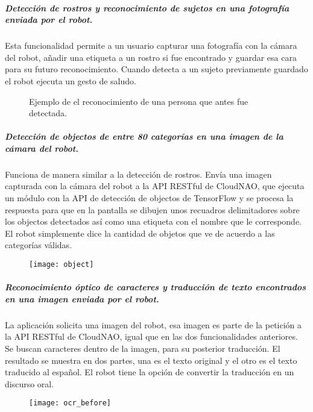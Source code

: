 \subparagraph{Detección de rostros y reconocimiento de sujetos en una fotografía enviada por el robot.}
\label{\detokenize{users_docs:deteccion-de-rostros-en-una-fotografia-enviada-por-el-robot}}
Esta funcionalidad permite a un usuario
capturar una fotografía con la cámara del robot, añadir
una etiqueta a un rostro si fue encontrado y guardar esa cara para su futuro reconocimiento.
Cuando detecta a un sujeto previamente guardado el robot ejecuta 
un gesto de saludo.

\begin{figure}[!h]
    \centering
    \caption{Ejemplo de el reconocimiento de una persona que antes fue detectada.}

\end{figure}


\subparagraph{Detección de objectos de entre 80 categorías en una imagen de la cámara del robot.}
\label{\detokenize{users_docs:deteccion-de-objectos-de-entre-80-categorias-en-una-imagen-de-la-camara-del-robot}}
Funciona de manera similar a la detección de rostros. Envía una imagen capturada
con la cámara del robot a la API RESTful de CloudNAO, que ejecuta un módulo
con la API de detección de objectos de TensorFlow y se procesa la respuesta para
que en la pantalla se dibujen unos
recuadros delimitadores sobre los objectos detectados así como una etiqueta
con el nombre que le corresponde. El robot simplemente
dice la cantidad de objetos que ve de acuerdo a las categorías válidas.

\begin{figure}[!h]
    \centering
	\texttt{[image: object]}%
\end{figure}


\subparagraph{Reconocimiento óptico de caracteres y traducción de texto encontrados en una imagen enviada por el robot.}
\label{\detokenize{users_docs:reconocimiento-optico-de-caracteres-y-traduccion-de-texto-encontrados-en-una-imagen-enviada-por-el-robot}}
La aplicación solicita una imagen del robot, esa imagen es parte de la petición
a la API RESTful de CloudNAO, igual que en las dos funcionalidades anteriores.
Se buscan caracteres dentro de la imagen, para su posterior traducción.
El resultado se muestra en dos partes, una es el texto original y el otro
es el texto traducido al español. El robot tiene la opción de convertir la
traducción en un discurso oral.

\begin{figure}[!h]
    \centering
    \texttt{[image: ocr\_before]}

\end{figure}


